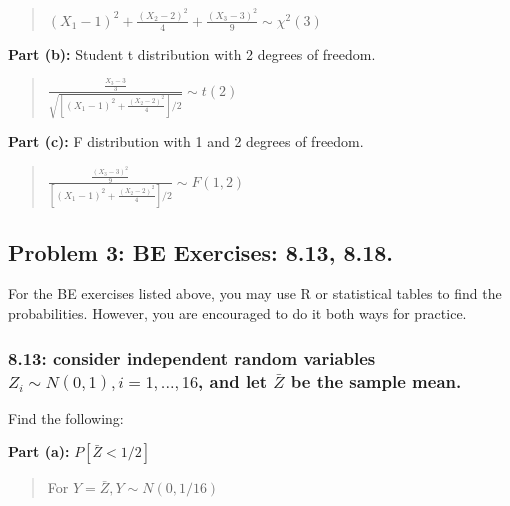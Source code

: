 \documentclass[
]{article}
\begin{document}
\begin{quote}
\((X_1 - 1)^2 + \frac{(X_2 - 2)^2}{4} + \frac{(X_3 - 3)^2}{9} \sim \chi^2(3)\)
\end{quote}

\textbf{Part (b):} Student t distribution with 2 degrees of freedom.

\begin{quote}
\(\frac{\frac{X_3 - 3}{3}}{\sqrt{\left[(X_1 - 1)^2 + \frac{(X_2 - 2)^2}{4}\right]/2} } \sim t(2)\)
\end{quote}

\textbf{Part (c):} F distribution with 1 and 2 degrees of freedom.

\begin{quote}
\(\frac{\frac{(X_3 - 3)^2}{9}}{\left[(X_1 - 1)^2 + \frac{(X_2 - 2)^2}{4}\right]/2 } \sim F(1,2)\)
\end{quote}

\hypertarget{problem-3-be-exercises-8.13-8.18.}{%
\subsection{Problem 3: BE Exercises: 8.13,
8.18.}\label{problem-3-be-exercises-8.13-8.18.}}

For the BE exercises listed above, you may use R or statistical tables
to find the probabilities. However, you are encouraged to do it both
ways for practice.

\hypertarget{consider-independent-random-variables-z_i-sim-n01-i-1...16-and-let-barz-be-the-sample-mean.}{%
\subsubsection{\texorpdfstring{8.13: consider independent random
variables \(Z_i \sim N(0,1), i = 1,...,16\), and let \(\bar{Z}\) be the
sample
mean.}{8.13: consider independent random variables Z\_i \textbackslash sim N(0,1), i = 1,...,16, and let \textbackslash bar\{Z\} be the sample mean.}}\label{consider-independent-random-variables-z_i-sim-n01-i-1...16-and-let-barz-be-the-sample-mean.}}

Find the following:

\textbf{Part (a):} \(P[\bar{Z} < 1/2]\)

\begin{quote}
For \(Y = \bar{Z}, Y \sim N(0, 1/16)\)
\end{quote}
\end{document}
